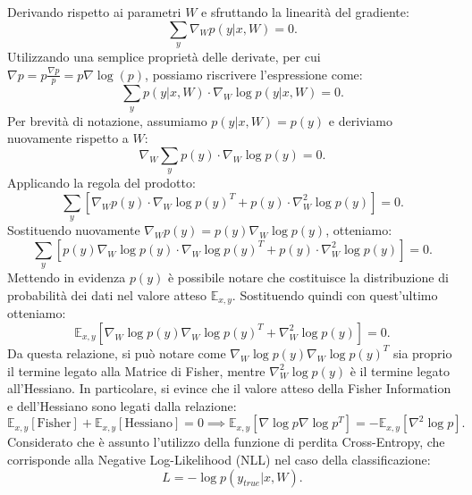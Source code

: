 Derivando rispetto ai parametri $W$ e sfruttando la linearità del gradiente:
\begin{equation}
    \sum_{y} \nabla_W p(y|x,W) = 0.
\end{equation}
Utilizzando una semplice proprietà delle derivate, per cui $\nabla p = p \frac{\nabla p}{p} = p \nabla \log(p)$, possiamo riscrivere l'espressione come:
\begin{equation}
    \sum_{y} p(y|x,W) \cdot \nabla_W \log p(y|x,W) = 0.
\end{equation}
Per brevità di notazione, assumiamo $p(y|x,W) = p(y)$ e deriviamo nuovamente rispetto a $W$:
\begin{equation}
    \nabla_W \sum_{y} p(y) \cdot \nabla_W \log p(y) = 0.
\end{equation}
Applicando la regola del prodotto:
\begin{equation}
    \sum_{y} \left[ \nabla_W p(y) \cdot \nabla_W \log p(y)^T + p(y) \cdot \nabla_W^2 \log p(y) \right] = 0.
\end{equation}
Sostituendo nuovamente $\nabla_W p(y) = p(y) \nabla_W \log p(y)$, otteniamo:
\begin{equation}
    \sum_{y} \left[ p(y) \nabla_W \log p(y) \cdot \nabla_W \log p(y)^T + p(y) \cdot \nabla_W^2 \log p(y) \right] = 0.
\end{equation}
Mettendo in evidenza $p(y)$ è possibile notare che costituisce la distribuzione di probabilità dei dati nel valore atteso $\mathbb{E}_{x,y}$. Sostituendo quindi con quest'ultimo otteniamo:
\begin{equation}
    \mathbb{E}_{x,y} \left[ \nabla_W \log p(y) \nabla_W \log p(y)^T + \nabla_W^2 \log p(y) \right] = 0.
\end{equation}
Da questa relazione, si può notare come $\nabla_W \log p(y) \nabla_W \log p(y)^T$ sia proprio il termine legato alla Matrice di Fisher, mentre $\nabla_W^2 \log p(y)$ è il termine legato all'Hessiano. In particolare, si evince che il valore atteso della Fisher Information e dell'Hessiano sono legati dalla relazione:
\begin{equation}
    \mathbb{E}_{x,y} [\text{Fisher}] + \mathbb{E}_{x,y} [\text{Hessiano}] = 0 \implies \mathbb{E}_{x,y} \left[ \nabla \log p \nabla \log p^T \right] = - \mathbb{E}_{x, y} \left[ \nabla^2 \log p \right].
    \label{eq:eq334}
\end{equation}
Considerato che è assunto l'utilizzo della funzione di perdita Cross-Entropy, che corrisponde alla Negative Log-Likelihood (NLL) nel caso della classificazione:
\begin{equation}
    L = -\log p(y_{true}|x,W).
\end{equation}
